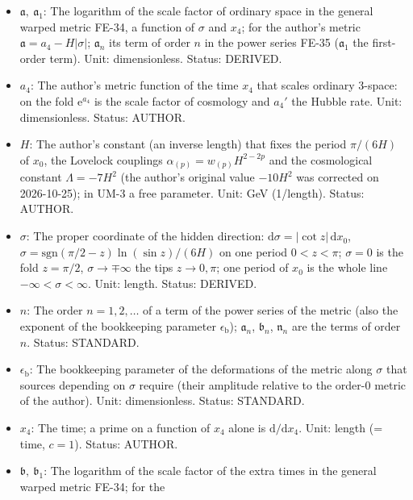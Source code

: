 \documentclass[
  10pt,
]{article}
\providecommand{\tightlist}{%
  \setlength{\itemsep}{0pt}\setlength{\parskip}{0pt}}
\begin{document}
\begin{itemize}
\tightlist
\item
  \(\mathfrak{a},\ \mathfrak{a}_1\): The logarithm of the scale factor
  of ordinary space in the general warped metric FE-34, a function of
  \(\sigma\) and \(x_4\); for the author's metric
  \(\mathfrak{a} = a_4 - H\lvert\sigma\rvert\); \(\mathfrak{a}_n\) its
  term of order \(n\) in the power series FE-35 (\(\mathfrak{a}_1\) the
  first-order term). Unit: dimensionless. Status: DERIVED.
\item
  \(a_4\): The author's metric function of the time \(x_4\) that scales
  ordinary 3-space: on the fold \(\mathrm{e}^{a_4}\) is the scale factor
  of cosmology and \(a_4'\) the Hubble rate. Unit: dimensionless.
  Status: AUTHOR.
\item
  \(H\): The author's constant (an inverse length) that fixes the period
  \(\pi/(6H)\) of \(x_0\), the Lovelock couplings
  \(\alpha_{(p)} = w_{(p)}H^{2-2p}\) and the cosmological constant
  \(\Lambda = -7H^2\) (the author's original value \(-10H^2\) was
  corrected on 2026-10-25); in UM-3 a free parameter. Unit: GeV
  (1/length). Status: AUTHOR.
\item
  \(\sigma\): The proper coordinate of the hidden direction:
  \(\mathrm{d}\sigma = \lvert\cot z\rvert\,\mathrm{d}x_0\),
  \(\sigma = \mathrm{sgn}(\pi/2 - z)\ln(\sin z)/(6H)\) on one period
  \(0 < z < \pi\); \(\sigma = 0\) is the fold \(z = \pi/2\),
  \(\sigma \to \mp\infty\) the tips \(z \to 0, \pi\); one period of
  \(x_0\) is the whole line \(-\infty < \sigma < \infty\). Unit: length.
  Status: DERIVED.
\item
  \(n\): The order \(n = 1, 2, \dots\) of a term of the power series of
  the metric (also the exponent of the bookkeeping parameter
  \(\epsilon_{\mathrm{b}}\)); \(\mathfrak{a}_n\), \(\mathfrak{b}_n\),
  \(\mathfrak{n}_n\) are the terms of order \(n\). Status: STANDARD.
\item
  \(\epsilon_{\mathrm{b}}\): The bookkeeping parameter of the
  deformations of the metric along \(\sigma\) that sources depending on
  \(\sigma\) require (their amplitude relative to the order-0 metric of
  the author). Unit: dimensionless. Status: STANDARD.
\item
  \(x_4\): The time; a prime on a function of \(x_4\) alone is
  \(\mathrm{d}/\mathrm{d}x_4\). Unit: length (= time, \(c = 1\)).
  Status: AUTHOR.
\item
  \(\mathfrak{b},\ \mathfrak{b}_1\): The logarithm of the scale factor
  of the extra times in the general warped metric FE-34; for the

\end{itemize}
\end{document}
